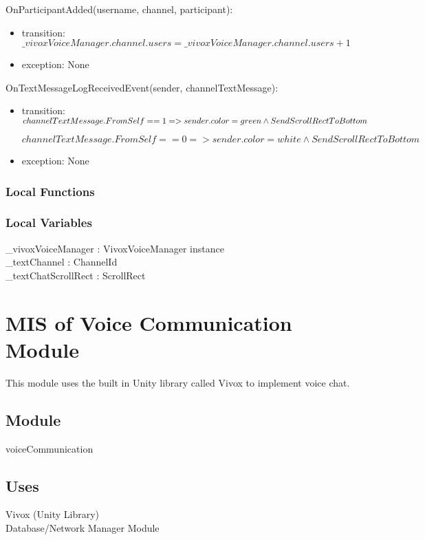 \documentclass[12pt, titlepage]{article}
\begin{document}
\noindent OnParticipantAdded(username, channel, participant):
\begin{itemize}
\item transition: $\_vivoxVoiceManager.channel.users = \_vivoxVoiceManager.channel.users + 1$
\item exception: None
\end{itemize}

\noindent OnTextMessageLogReceivedEvent(sender, channelTextMessage):
\begin{itemize}
\item transition: $channelTextMessage.FromSelf == 1 => sender.color = green \newline \land SendScrollRectToBottom$

$channelTextMessage.FromSelf == 0 => sender.color = white \land SendScrollRectToBottom$
\item exception: None
\end{itemize}

\subsubsection{Local Functions}


\subsubsection{Local Variables}
\_vivoxVoiceManager : VivoxVoiceManager instance\\
\_textChannel : ChannelId\\
\_textChatScrollRect : ScrollRect\\


\newpage

\section{MIS of Voice Communication Module} \label{sec:voice} 
This module uses the built in Unity library called Vivox to implement voice chat.

\subsection{Module}
voiceCommunication

\subsection{Uses}
Vivox (Unity Library)\\
Database/Network Manager Module
\end{document}
